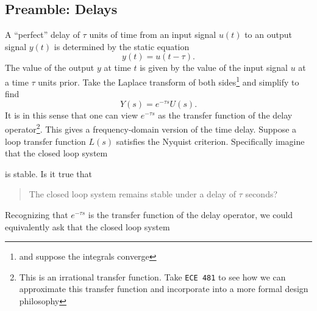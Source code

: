 \subsection{Preamble: Delays}
A ``perfect'' delay of \(\tau\) units of time from an input signal \(u(t)\) to an output signal \(y(t)\) is determined by the static equation
\[
  y(t) = u(t - \tau).
\]
The value of the output \(y\) at time \(t\) is given by the value of the input signal \(u\) at a time \(\tau\) units prior.
Take the Laplace transform of both sides\footnote{and suppose the integrals converge} and simplify to find
\[
  Y(s) = e^{-\tau s} U(s).
\]
It is in this sense that one can view \(e^{-\tau s}\) as the transfer function of the delay operator\footnote{This is an irrational transfer function. Take \texttt{ECE 481} to see how we can approximate this transfer function and incorporate into a more formal design philosophy}.
This gives a frequency-domain version of the time delay.
%
Suppose a loop transfer function \(L(s)\) satisfies the Nyquist criterion.
Specifically imagine that the closed loop system
%
\begin{center}
\end{center}
%
is stable.
Is it true that
\begin{quote}
  The closed loop system remains stable under a delay of \(\tau\) seconds?
\end{quote}
Recognizing that \(e^{-\tau s}\) is the transfer function of the delay operator, we could equivalently ask that the closed loop system
%
